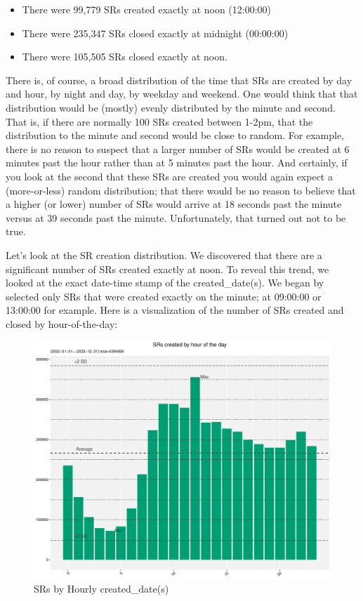\documentclass[12pt, titlepage]{article}
\begin{document}
	\begin{itemize}
		 \item There were 99,779 SRs created exactly at noon (12:00:00)
		 \item There were 235,347 SRs closed exactly at midnight (00:00:00)
		\item There were 105,505 SRs closed exactly at noon. 
	\end{itemize}
	
	There is, of course, a broad distribution of the time that SRs are 
	created by day and hour, by night and day, by weekday and weekend.  
	One would think that that distribution would be (mostly) evenly distributed 
	by the minute and second. That is, if there are normally 100 SRs created 
	between 1-2pm, that the distribution to the minute and second would be 
	close to random. For example, there is no reason to suspect that a larger 
	number of SRs would be created at 6 minutes past the hour rather 
	than at 5 minutes past the hour. And certainly, if you look at the second 
	that these SRs are created you would again expect a (more-or-less) 
	random distribution; that there would be no reason to believe that a higher 
	(or lower) number of SRs would arrive at 18 seconds past the minute 
	versus at 39 seconds past the minute. Unfortunately, that turned out not to be true.
	
	Let's look at the SR creation distribution. We discovered that there 
	are a significant number of SRs created exactly at noon. To reveal this trend, 
	we looked at the exact date-time stamp of the created\_date(s). We began 
	by selected only SRs that were created exactly on the minute; at 09:00:00 
	or 13:00:00 for example.  Here is a visualization of the number of SRs 
	created and closed by hour-of-the-day:
	
	\begin{figure}[tbp]
		\centering
		\includegraphics[width = \textwidth]{Created_Hourly_SR_count.pdf}
		\caption{SRs by Hourly created\_date(s)}
		\label{fig:hourly-created}
	\end{figure}	
	
\end{document}
